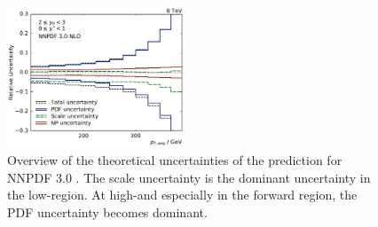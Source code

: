 \begin{figure}[htp]
    \includegraphics[width=0.47\textwidth]{figures/theory/theo_unc_overview_yb2ys0.pdf}
    \caption[Overview of theoretical uncertainties]{Overview of the theoretical
        uncertainties of the \NLOJETPP prediction for NNPDF 3.0 .
    The scale uncertainty is the dominant uncertainty in the low-\pt region. At
    high-\pt and especially in the forward region, the PDF uncertainty becomes
    dominant.}
    \label{fig:theo_uncertainties}
\end{figure}
